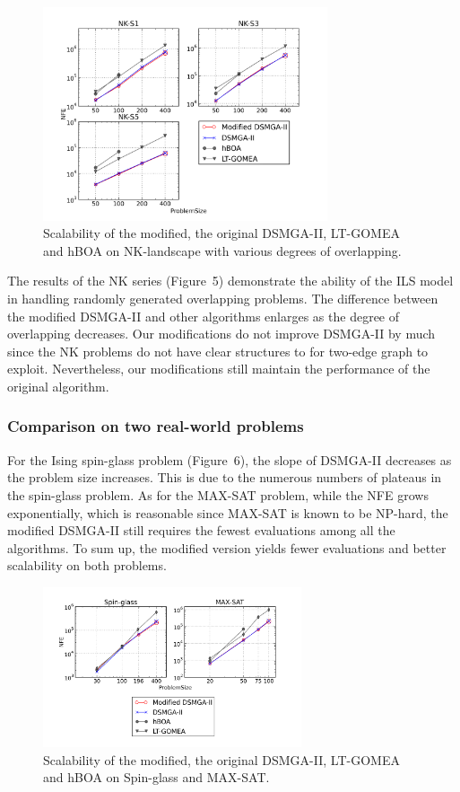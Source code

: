 \documentclass{sig-alternate-05-2015}
\begin{document}
\begin{figure}
\centering
\includegraphics[width=3.3in]{nkResults}
\caption{Scalability of the modified, the original DSMGA-II, LT-GOMEA and hBOA on NK-landscape with various degrees of overlapping.}
\end{figure}


The results of the NK series (Figure~5) demonstrate the ability of the ILS model in handling randomly generated overlapping problems. 
The difference between the modified DSMGA-II and other algorithms enlarges as the degree of overlapping decreases. 
Our modifications do not improve DSMGA-II by much since the NK problems do not have clear structures to for two-edge graph to exploit. Nevertheless, our modifications still maintain the performance of the original algorithm. 

\subsubsection{ Comparison on two real-world problems }

For the Ising spin-glass problem (Figure~6), the slope of DSMGA-II decreases as the problem size increases. 
This is due to the numerous numbers of plateaus in the spin-glass problem.
As for the MAX-SAT problem, while the NFE grows exponentially, which is reasonable since MAX-SAT is known to be NP-hard, the modified DSMGA-II still requires the fewest evaluations among all the algorithms. To sum up, the modified version yields fewer evaluations and better scalability on both problems. 

\begin{figure}
\centering
\includegraphics[width=3in]{spin_satResults}
\caption{Scalability of the modified, the original DSMGA-II, LT-GOMEA and hBOA on Spin-glass and MAX-SAT.}
\end{figure}
\end{document}
